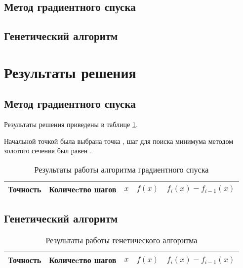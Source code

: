 \documentclass[10pt,a4paper,titlepage]{article}
\begin{document}
\subsection{Метод градиентного спуска}
\lstset{language=C++, caption=Градиентный спуск,%
label=gd-source-code, basicstyle=\footnotesize,%
numbers=left, numberstyle=\footnotesize, numbersep=5pt, frame=single, breaklines=true, breakatwhitespace=false,%
inputencoding=utf8x}


\subsection{Генетический алгоритм}

\section{Результаты решения}
\subsection{Метод градиентного спуска}
Результаты решения приведены в таблице \ref{gd-result-table}.

Начальной точкой была выбрана точка \!, %
шаг для поиска минимума методом золотого сечения был равен \!. %

\begin{table}[H]
\caption{Результаты работы алгоритма градиентного спуска}
\label{gd-result-table}
\begin{center}
\begin{tabular}{|c|c|c|c|c|}
\hline
Точность & Количеcтво шагов & $x$ & $f(x)$ & $f_i(x) - f_{i - 1}(x)$ \\
\hline

\hline
\end{tabular}
\end{center}
\end{table}

\subsection{Генетический алгоритм}

\begin{table}[H]
\caption{Результаты работы генетического алгоритма}
\label{gen-result-table}
\begin{center}
\begin{tabular}{|c|c|c|c|c|}
\hline
Точность & Количеcтво шагов & $x$ & $f(x)$ & $f_i(x) - f_{i - 1}(x)$ \\
\hline

\hline
\end{tabular}
\end{center}
\end{table}
\end{document}
